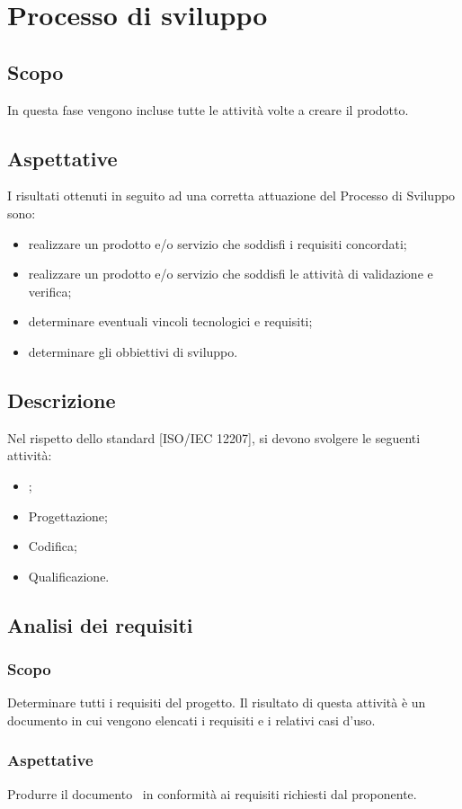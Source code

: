 \documentclass[../NormeDiProgetto.tex]{subfiles}
\begin{document}
	\section{Processo di sviluppo}
		\subsection{Scopo}
			In questa fase vengono incluse tutte le attività volte a creare il prodotto.
		\subsection{Aspettative}
			I risultati ottenuti in seguito ad una corretta attuazione del Processo di Sviluppo sono:
			\begin{itemize}
				\item realizzare un prodotto e/o servizio che soddisfi i requisiti concordati;
				\item realizzare un prodotto e/o servizio che soddisfi le attività di validazione e verifica;
				\item determinare eventuali vincoli tecnologici e requisiti;
				\item determinare gli obbiettivi di sviluppo.
			\end{itemize}
		\subsection{Descrizione}
			Nel rispetto dello standard [ISO/IEC 12207], si devono svolgere le seguenti attività:
			\begin{itemize}
				\item \analisideirequisiti ;
				\item Progettazione;
				\item Codifica;
				\item Qualificazione.
			\end{itemize}
		\subsection{Analisi dei requisiti}
			\subsubsection{Scopo}
				Determinare tutti i requisiti del progetto. Il risultato di questa attività è un documento in cui vengono elencati i requisiti e i relativi casi d'uso.
			\subsubsection{Aspettative}
				Produrre il documento \analisideirequisiti\ in conformità ai requisiti richiesti dal proponente.
\end{document}
